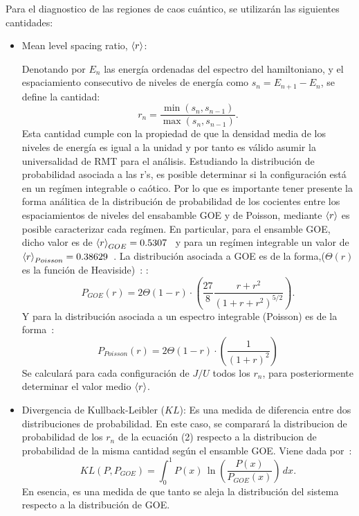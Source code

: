 \documentclass[spanish,titlepage,table]{practicas}
\begin{document}
Para el diagnostico de las regiones de caos cuántico, se utilizarán las siguientes cantidades:
\begin{itemize}
    \item Mean level spacing ratio, $\ev{r}$:

Denotando por $E_n$ las energía ordenadas del espectro del hamiltoniano, y el espaciamiento consecutivo de niveles de energía como 
    $s_n=E_{n+1}-E_{n}$, se define la cantidad:
		\begin{equation}
			r_n=\frac{\min(s_n,s_{n-1})}{\max(s_n,s_{n-1})}.
		\end{equation}
    Esta cantidad cumple con la propiedad de que la densidad media de los niveles de energía es igual a la unidad
    y por tanto es válido asumir la universalidad de RMT para el análisis.
    Estudiando la distribución de probabilidad asociada a las r's, es posible determinar si la configuración está en un regímen integrable 
    o caótico. Por lo que es importante tener presente la forma análitica de la distribución de probabilidad de los cocientes entre 
    los espaciamientos de niveles del ensabamble GOE y de Poisson, mediante $\ev{r}$ es posible caracterizar cada 
    regímen. En particular, para el ensamble GOE, dicho valor es de $\ev{r}_{GOE}=0.5307$~\cite{Atas_2013} y para un regímen integrable un valor de $\ev{r}_{Poisson}=0.38629$~\cite{Atas_2013}. 
    La distribución asociada a GOE es de la forma,($\Theta(r)$ es la función de Heaviside)~\cite{Atas_2013}:
     :
\begin{equation}
    P_{GOE}(r)=2\Theta(1-r)\cdot(\frac{27}{8}\frac{r+r^{2}}{(1+r+r^{2})^{5/2}}).
\end{equation}
Y para la distribución asociada a un espectro integrable (Poisson) es de la forma~\cite{Tekur2020}:
\begin{equation}
    P_{Poisson}(r)=2\Theta(1-r)\cdot(\frac{1}{(1+r)^{2}})
\end{equation}
    Se calculará para cada configuración de $J/U$ todos los $r_n$, para posteriormente determinar el valor medio $\ev{r}$.

    \item Divergencia de Kullback-Leibler ($KL$): Es una medida de diferencia entre dos distribuciones de probabilidad. En este caso, se comparará la distribucion de probabilidad de los $r_n$ de la ecuación (2)
    respecto a la distribucion de probabilidad de la misma cantidad según el ensamble GOE. Viene dada por~\cite{Pausch2022}:
    \begin{equation}
KL(P,P_{GOE}) = \int_{0}^{1} P(x) \, \ln \left( \frac{P(x)}{P_{GOE}(x)} \right) \, dx.
    \end{equation}
    En esencia, es una medida de que tanto se aleja la distribución del sistema respecto a la distribución de GOE.   
\end{itemize}
\end{document}
